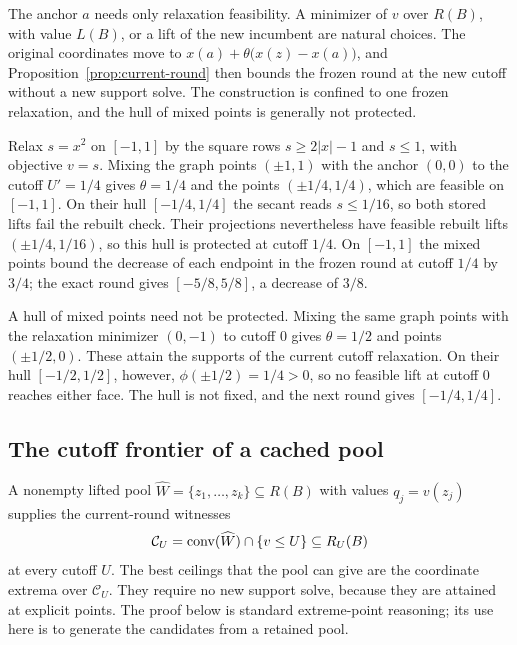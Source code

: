 The anchor $a$ needs only relaxation feasibility. A minimizer of $v$ over
$R(B)$, with value $L(B)$, or a lift of the new incumbent are natural
choices. The original coordinates move to
$x(a)+\theta\bigl(x(z)-x(a)\bigr)$, and
Proposition~\ref{prop:current-round} then bounds the frozen round at the
new cutoff without a new support solve. The construction is confined to
one frozen relaxation, and the hull of mixed points is generally not
protected.

\begin{example}\label{ex:mixing-hull}
Relax $s=x^2$ on $[-1,1]$ by the square rows $s\ge2|x|-1$ and $s\le1$,
with objective $v=s$.
Mixing the graph points $(\pm1,1)$ with the anchor $(0,0)$ to the cutoff
$U'=1/4$ gives $\theta=1/4$ and the points $(\pm1/4,1/4)$, which are
feasible on $[-1,1]$. On their hull $[-1/4,1/4]$ the secant reads
$s\le1/16$, so both stored lifts fail the rebuilt check. Their projections
nevertheless have feasible rebuilt lifts $(\pm1/4,1/16)$, so this hull is
protected at cutoff $1/4$. On $[-1,1]$ the mixed points bound
the decrease of each endpoint in the frozen round at cutoff $1/4$ by
$3/4$; the exact round gives $[-5/8,5/8]$, a decrease of $3/8$.

A hull of mixed points need not be protected. Mixing the same graph
points with the relaxation minimizer $(0,-1)$ to cutoff $0$ gives
$\theta=1/2$ and points $(\pm1/2,0)$. These attain the supports of the
current cutoff relaxation. On their hull $[-1/2,1/2]$, however,
$\phi(\pm1/2)=1/4>0$, so no feasible lift at cutoff $0$ reaches either
face. The hull is not fixed, and the next round gives $[-1/4,1/4]$.
\end{example}

\subsection{The cutoff frontier of a cached pool}\label{sec:cutoff-frontier}

A nonempty lifted pool $\widehat W=\{z_1,\ldots,z_k\}\subseteq R(B)$ with
values $q_j=v(z_j)$ supplies the current-round witnesses
\[
 \mathcal C_U=\operatorname{conv}(\widehat W)\cap\{v\le U\}\subseteq R_U(B)
\]
at every cutoff $U$. The best ceilings that the pool can give are the
coordinate extrema over $\mathcal C_U$. They require no new support
solve, because they are attained at explicit points. The proof below is
standard extreme-point reasoning; its use here is to generate the
candidates from a retained pool.

